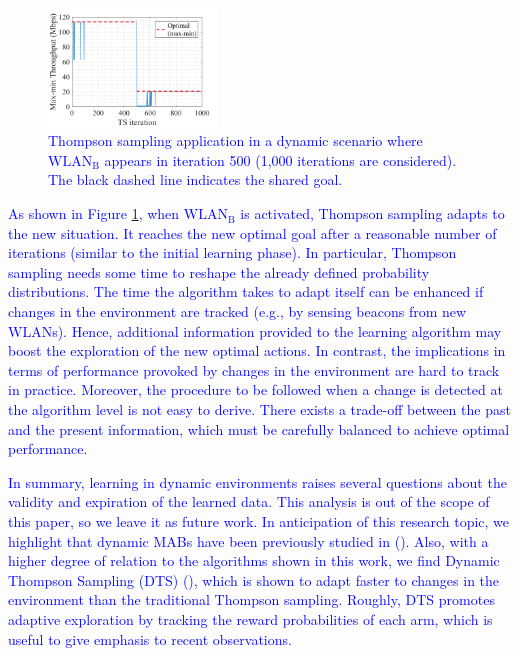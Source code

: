\documentclass[preprint,12pt]{elsarticle}
\begin{document}
\begin{figure}[h!]
	\centering   		
	\includegraphics[width=0.4\textwidth]{max_min_tpt_1_4}
	\caption{\textcolor{blue}{Thompson sampling application in a dynamic scenario where $\text{WLAN}_\text{B}$ appears in iteration 500 (1,000 iterations are considered). The black dashed line indicates the shared goal.}}
	\label{fig:dynamic_wlan}
\end{figure}   	

\textcolor{blue}{As shown in Figure \ref{fig:dynamic_wlan}, when $\text{WLAN}_\text{B}$ is activated, Thompson sampling adapts to the new situation. It reaches the new optimal goal after a reasonable number of iterations (similar to the initial learning phase). In particular, Thompson sampling needs some time to reshape the already defined probability distributions. The time the algorithm takes to adapt itself can be enhanced if changes in the environment are tracked (e.g., by sensing beacons from new WLANs). Hence, additional information provided to the learning algorithm may boost the exploration of the new optimal actions. In contrast, the implications in terms of performance provoked by changes in the environment are hard to track in practice. Moreover, the procedure to be followed when a change is detected at the algorithm level is not easy to derive. There exists a trade-off between the past and the present information, which must be carefully balanced to achieve optimal performance.}


\textcolor{blue}{In summary, learning in dynamic environments raises several questions about the validity and expiration of the learned data. This analysis is out of the scope of this paper, so we leave it as future work. In anticipation of this research topic, we highlight that dynamic MABs have been previously studied in (\citealp{hartland2006multi}). Also, with a higher degree of relation to the algorithms shown in this work, we find Dynamic Thompson Sampling (DTS) (\citealp{gupta2011thompson}), which is shown to adapt faster to changes in the environment than the traditional Thompson sampling. Roughly, DTS promotes adaptive exploration by tracking the reward probabilities of each arm, which is useful to give emphasis to recent observations.}
\end{document}
